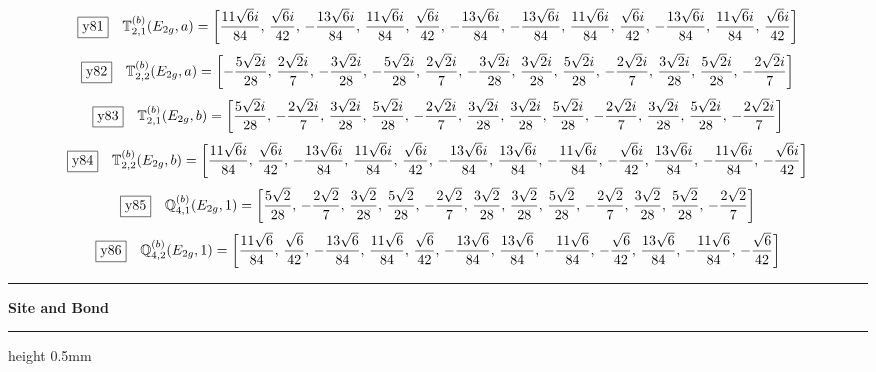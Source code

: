 \documentclass[fleqn,10pt,landscape]{jsarticle}
\begin{document}
\begin{dmath*}
\fbox{y81}\quad \mathbb{T}_{2,1}^{(b)}(E_{2g},a)=\left[ \frac{11 \sqrt{6} i}{84},\, \frac{\sqrt{6} i}{42},\, - \frac{13 \sqrt{6} i}{84},\, \frac{11 \sqrt{6} i}{84},\, \frac{\sqrt{6} i}{42},\, - \frac{13 \sqrt{6} i}{84},\, - \frac{13 \sqrt{6} i}{84},\, \frac{11 \sqrt{6} i}{84},\, \frac{\sqrt{6} i}{42},\, - \frac{13 \sqrt{6} i}{84},\, \frac{11 \sqrt{6} i}{84},\, \frac{\sqrt{6} i}{42} \right]
\end{dmath*}
\begin{dmath*}
\fbox{y82}\quad \mathbb{T}_{2,2}^{(b)}(E_{2g},a)=\left[ - \frac{5 \sqrt{2} i}{28},\, \frac{2 \sqrt{2} i}{7},\, - \frac{3 \sqrt{2} i}{28},\, - \frac{5 \sqrt{2} i}{28},\, \frac{2 \sqrt{2} i}{7},\, - \frac{3 \sqrt{2} i}{28},\, \frac{3 \sqrt{2} i}{28},\, \frac{5 \sqrt{2} i}{28},\, - \frac{2 \sqrt{2} i}{7},\, \frac{3 \sqrt{2} i}{28},\, \frac{5 \sqrt{2} i}{28},\, - \frac{2 \sqrt{2} i}{7} \right]
\end{dmath*}
\begin{dmath*}
\fbox{y83}\quad \mathbb{T}_{2,1}^{(b)}(E_{2g},b)=\left[ \frac{5 \sqrt{2} i}{28},\, - \frac{2 \sqrt{2} i}{7},\, \frac{3 \sqrt{2} i}{28},\, \frac{5 \sqrt{2} i}{28},\, - \frac{2 \sqrt{2} i}{7},\, \frac{3 \sqrt{2} i}{28},\, \frac{3 \sqrt{2} i}{28},\, \frac{5 \sqrt{2} i}{28},\, - \frac{2 \sqrt{2} i}{7},\, \frac{3 \sqrt{2} i}{28},\, \frac{5 \sqrt{2} i}{28},\, - \frac{2 \sqrt{2} i}{7} \right]
\end{dmath*}
\begin{dmath*}
\fbox{y84}\quad \mathbb{T}_{2,2}^{(b)}(E_{2g},b)=\left[ \frac{11 \sqrt{6} i}{84},\, \frac{\sqrt{6} i}{42},\, - \frac{13 \sqrt{6} i}{84},\, \frac{11 \sqrt{6} i}{84},\, \frac{\sqrt{6} i}{42},\, - \frac{13 \sqrt{6} i}{84},\, \frac{13 \sqrt{6} i}{84},\, - \frac{11 \sqrt{6} i}{84},\, - \frac{\sqrt{6} i}{42},\, \frac{13 \sqrt{6} i}{84},\, - \frac{11 \sqrt{6} i}{84},\, - \frac{\sqrt{6} i}{42} \right]
\end{dmath*}
\begin{dmath*}
\fbox{y85}\quad \mathbb{Q}_{4,1}^{(b)}(E_{2g},1)=\left[ \frac{5 \sqrt{2}}{28},\, - \frac{2 \sqrt{2}}{7},\, \frac{3 \sqrt{2}}{28},\, \frac{5 \sqrt{2}}{28},\, - \frac{2 \sqrt{2}}{7},\, \frac{3 \sqrt{2}}{28},\, \frac{3 \sqrt{2}}{28},\, \frac{5 \sqrt{2}}{28},\, - \frac{2 \sqrt{2}}{7},\, \frac{3 \sqrt{2}}{28},\, \frac{5 \sqrt{2}}{28},\, - \frac{2 \sqrt{2}}{7} \right]
\end{dmath*}
\begin{dmath*}
\fbox{y86}\quad \mathbb{Q}_{4,2}^{(b)}(E_{2g},1)=\left[ \frac{11 \sqrt{6}}{84},\, \frac{\sqrt{6}}{42},\, - \frac{13 \sqrt{6}}{84},\, \frac{11 \sqrt{6}}{84},\, \frac{\sqrt{6}}{42},\, - \frac{13 \sqrt{6}}{84},\, \frac{13 \sqrt{6}}{84},\, - \frac{11 \sqrt{6}}{84},\, - \frac{\sqrt{6}}{42},\, \frac{13 \sqrt{6}}{84},\, - \frac{11 \sqrt{6}}{84},\, - \frac{\sqrt{6}}{42} \right]
\end{dmath*}
\vspace{5mm}
\noindent \rule[0.5mm]{5mm}{0.5mm}\hspace{3mm}\textbf{Site and Bond}\hspace{3mm}\leaders\hrule height 0.5mm\hfill\kern0pt
\vspace{3mm}
\end{document}
